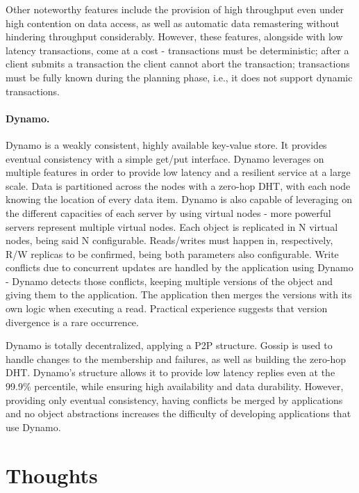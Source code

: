 Other noteworthy features include the provision of high throughput even under high contention on data access, as well as automatic data remastering without hindering throughput considerably.
However, these features, alongside with low latency transactions, come at a cost - transactions must be deterministic; after a client submits a transaction the client cannot abort the transaction; transactions must be fully known during the planning phase, i.e., it does not support dynamic transactions.

\paragraph{Dynamo.} Dynamo \cite{dynamo} is a weakly consistent, highly available key-value store.
It provides eventual consistency with a simple get/put interface.
Dynamo leverages on multiple features in order to provide low latency and a resilient service at a large scale.
Data is partitioned across the nodes with a zero-hop DHT, with each node knowing the location of every data item.
Dynamo is also capable of leveraging on the different capacities of each server by using virtual nodes - more powerful servers represent multiple virtual nodes.
Each object is replicated in N virtual nodes, being said N configurable. Reads/writes must happen in, respectively, R/W replicas to be confirmed, being both parameters also configurable.
Write conflicts due to concurrent updates are handled by the application using Dynamo - Dynamo detects those conflicts, keeping multiple versions of the object and giving them to the application.
The application then merges the versions with its own logic when executing a read.
Practical experience suggests that version divergence is a rare occurrence.

Dynamo is totally decentralized, applying a P2P structure.
Gossip is used to handle changes to the membership and failures, as well as building the zero-hop DHT.
Dynamo's structure allows it to provide low latency replies even at the 99.9\% percentile, while ensuring high availability and data durability.
However, providing only eventual consistency, having conflicts be merged by applications and no object abstractions increases the difficulty of developing applications that use Dynamo.

\section{Thoughts}

